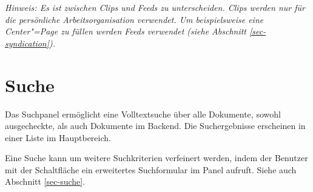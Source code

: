 \textit{Hinweis: Es ist zwischen Clips und Feeds zu unterscheiden. Clips werden
nur für die persönliche Arbeitsorganisation verwendet. Um beispielsweise eine
Center"=Page zu füllen werden Feeds verwendet (siehe Abschnitt
\vref{sec-syndication}).}


\section{Suche}

  
  Das Suchpanel ermöglicht eine Volltextsuche über alle Dokumente, sowohl
  ausgecheckte, als auch Dokumente im Backend. Die Suchergebnisse erscheinen
  in einer Liste im Hauptbereich.

  Eine Suche kann um weitere Suchkriterien verfeinert werden, indem der
  Benutzer mit der Schaltfläche  ein erweitertes
  Suchformular im Panel aufruft. Siehe auch Abschnitt \vref{sec-suche}.
